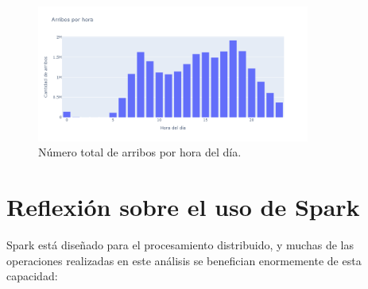 \documentclass[12pt]{article}
\begin{document}
    \begin{figure}[htbp]
        \centering
        \includegraphics[width=0.8\textwidth]{Media/arribos_hora.png} %
        \caption{Número total de arribos por hora del día.}
        \label{fig:hora_arribos}
    \end{figure}

    \clearpage %

\section{Reflexión sobre el uso de Spark}
    Spark está diseñado para el procesamiento distribuido, y muchas de las operaciones realizadas en este análisis se benefician enormemente de esta capacidad:
\end{document}
